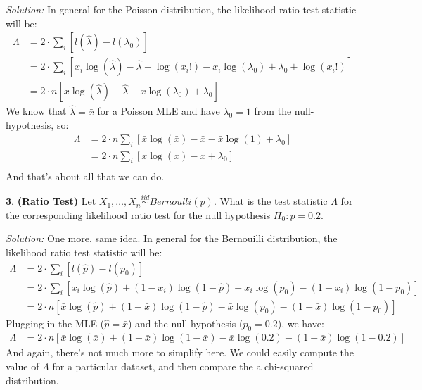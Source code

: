 \documentclass{tufte-handout}
\newcommand{\iid}{\stackrel{iid}{\sim}}
\begin{document}
\textit{Solution:} In general for the Poisson distribution, the likelihood ratio test statistic
will be:
\begin{align*}
\Lambda &= 2 \cdot \sum_i \left[ l(\hat{\lambda}) - l(\lambda_0)  \right] \\
&= 2 \cdot \sum_i \left[ x_i \log(\hat{\lambda}) - \hat{\lambda} - \log(x_i!) - 
                         x_i \log(\lambda_0) + \lambda_0 + \log(x_i!)  \right] \\
&= 2 \cdot n \left[ \bar{x} \log(\hat{\lambda}) - \hat{\lambda} - \bar{x} \log(\lambda_0) + \lambda_0 \right] 
\end{align*}
We know that $\hat{\lambda} = \bar{x}$ for a Poisson MLE and have $\lambda_0 = 1$
from the null-hypothesis, so:
\begin{align*}
\Lambda
&= 2 \cdot n \sum_i \left[ \bar{x} \log(\bar{x}) - \bar{x} - \bar{x} \log(1) + \lambda_0 \right] \\ 
&= 2 \cdot n \sum_i \left[ \bar{x} \log(\bar{x}) - \bar{x} + \lambda_0 \right] \\ 
\end{align*}
And that's about all that we can do. 

\textbf{3}. \textbf{(Ratio Test)} Let $X_1, \ldots, X_n \iid Bernoulli(p)$.
What is the test statistic $\Lambda$ for the corresponding likelihood 
ratio test for the null hypothesis $H_0: p = 0.2$.

\textit{Solution:} One more, same idea. In general for the Bernouilli distribution, the likelihood
ratio test statistic will be:
\begin{align*}
\Lambda
&= 2 \cdot \sum_i \left[ l(\hat{p}) - l(p_0)  \right] \\
&= 2 \cdot \sum_i \left[ x_i \log(\hat{p}) + (1-x_i) \log(1 - \hat{p}) -
                         x_i \log(p_0) - (1-x_i) \log(1 - p_0) \right] \\
&= 2 \cdot n \left[ \bar{x} \log(\hat{p}) + (1-\bar{x}) \log(1 - \hat{p}) -
                    \bar{x} \log(p_0) - (1-\bar{x}) \log(1 - p_0) \right]                       
\end{align*}
Plugging in the MLE ($\hat{p} = \bar{x}$) and the null hypothesis ($p_0 = 0.2$),
we have:
\begin{align*}
\Lambda
&= 2 \cdot n \left[ \bar{x} \log(\bar{x}) + (1-\bar{x}) \log(1 - \bar{x}) -
                    \bar{x} \log(0.2) - (1-\bar{x}) \log(1 - 0.2) \right]                       
\end{align*}
And again, there's not much more to simplify here. We could easily compute
the value of $\Lambda$ for a particular dataset, and then compare the a 
chi-squared distribution.
\end{document}
